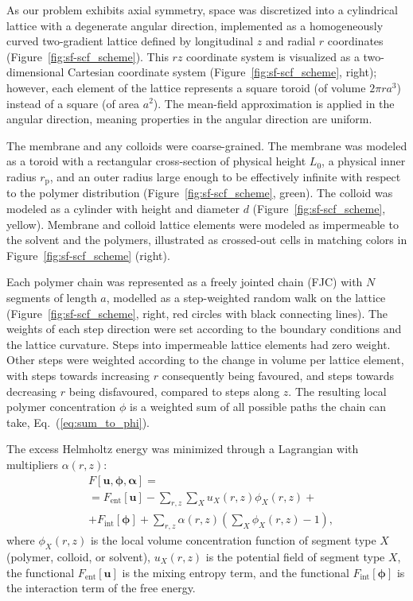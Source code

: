 \documentclass[10pt, a4paper, twocolumn]{article}
\begin{document}
As our problem exhibits axial symmetry, space was discretized into a cylindrical lattice with a degenerate angular direction,
implemented as a homogeneously curved two-gradient lattice defined by longitudinal $z$ and radial $r$ coordinates (Figure~\ref{fig:sf-scf_scheme}).
This $rz$ coordinate system is visualized as a two-dimensional Cartesian coordinate system (Figure~\ref{fig:sf-scf_scheme}, right); however, each element of the lattice represents a square toroid (of volume $2 \pi r a^3$) instead of a square (of area $a^2$).
The mean-field approximation is applied in the angular direction, meaning properties in the angular direction are uniform.

The membrane and any colloids were coarse-grained.
The membrane was modeled as a toroid with a rectangular cross-section of physical height $L_0$, a physical inner radius $r_{\text{p}}$, and an outer radius large enough to be effectively infinite with respect to the polymer distribution (Figure~\ref{fig:sf-scf_scheme}, green).
The colloid was modeled as a cylinder with height and diameter $d$ (Figure~\ref{fig:sf-scf_scheme}, yellow).
Membrane and colloid lattice elements were modeled as impermeable to the solvent and the polymers, illustrated as crossed-out cells in matching colors in Figure~\ref{fig:sf-scf_scheme} (right).

Each polymer chain was represented as a freely jointed chain (FJC) with $N$ segments of length $a$, modelled as a step-weighted random walk on the lattice (Figure~\ref{fig:sf-scf_scheme}, right, red circles with black connecting lines).
The weights of each step direction were set according to the boundary conditions and the lattice curvature.
Steps into impermeable lattice elements had zero weight.
Other steps were weighted according to the change in volume per lattice element, with steps towards increasing $r$ consequently being favoured, and steps towards decreasing $r$ being disfavoured, compared to steps along $z$.
The resulting local polymer concentration $\phi$ is a weighted sum of all possible paths the chain can take, Eq.~(\ref{eq:sum_to_phi}).

The excess Helmholtz energy was minimized through a Lagrangian with multipliers $\alpha(r,z)$:
\begin{equation}
    \label{eq:fe_lagrangian}
    \begin{aligned}
        &F[\bm{u}, \boldsymbol{\phi}, \boldsymbol{\alpha}] =\\
        &= F_{\text{ent}}[\bm{u}] - \sum\limits_{r,z} \sum\limits_X u_X(r, z) \phi_X(r, z) + \\
        &+ F_{\text{int}} [\boldsymbol{\phi}] 
        + \sum\limits_{r,z} \alpha(r, z) \left( \sum\limits_X \phi_X(r, z) - 1 \right),
    \end{aligned} 
\end{equation}
where $\phi_X(r,z)$ is the local volume concentration function of segment type $X$ (polymer, colloid, or solvent), $u_X(r, z)$ is the potential field of segment type $X$, the functional $F_{\text{ent}}[\bm{u}]$ is the mixing entropy term, and the functional $F_{\text{int}} [\boldsymbol{\phi}]$ is the interaction term of the free energy.
\end{document}
